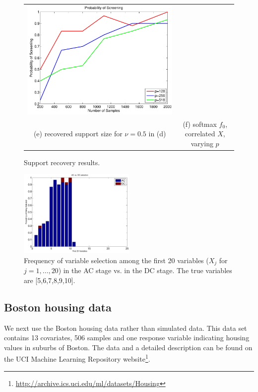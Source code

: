 \begin{figure}[!t]
\begin{center}
\begin{tabular}{cc}
\includegraphics[width=.42\textwidth]{figs/CurveS}\\
(e) recovered support size for $\nu=0.5$ in (d) & (f) softmax $f_0$, correlated $X$, varying $p$ \\
\end{tabular}
\end{center}
\caption{Support recovery results.}
\label{Support}
\vskip10pt
\end{figure}

\begin{figure}
\includegraphics[width=0.5\textwidth]{figs/ACvDC}
\caption{Frequency of variable selection among the first 20 variables ($X_j$ for $j=1,\ldots,20$) in the AC stage vs. in the DC stage. The true variables are [5,6,7,8,9,10].}
\label{fig:ac_v_dc}
\end{figure}


\subsection{Boston housing data}

We next use the Boston housing data rather than simulated data. This
data set contains 13 covariates, 506 samples and one response variable
indicating housing values in suburbs of Boston. The data and a
detailed description can be found on the UCI Machine Learning
Repository
website\footnote{\url{http://archive.ics.uci.edu/ml/datasets/Housing}}.

